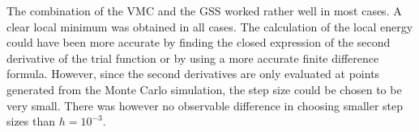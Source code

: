 \documentclass[twocolumn]{article}
\begin{document}
\begin{large}
The combination of the VMC and the GSS worked rather well in most cases. A clear local minimum was obtained in all cases. The calculation of the local energy could have been more accurate by finding the closed expression of the second derivative of the trial function or by using a more accurate finite difference formula. However, since the second derivatives are only evaluated at points generated from the Monte Carlo simulation, the step size could be chosen to be very small. There was however no observable difference in choosing smaller step sizes than $h=10^{-3}$. 





\end{large}
\end{document}
